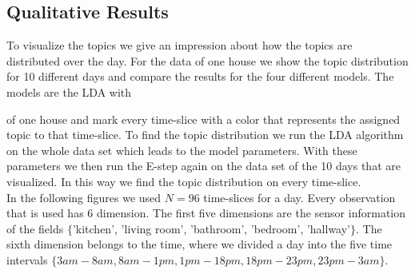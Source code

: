 \documentclass[a4paper,fleqn]{article}
\begin{document}








\subsection{Qualitative Results}
To visualize the topics we give an impression about how the topics are distributed over the day. For the data of one house we show the topic distribution for 10 different days and compare the results for the four different models. The models are the LDA with 

of one house and mark every time-slice with a color that represents the assigned topic to that time-slice. To find the topic distribution we run the LDA algorithm on the whole data set which leads to the model parameters. With these parameters we then run the E-step again on the data set of the 10 days that are visualized. In this way we find the topic distribution on every time-slice.\\
In the following figures we used $N=96$ time-slices for a day. Every observation that is used has 6 dimension. The first five dimensions are the sensor information of the fields $\{$'kitchen', 'living room', 'bathroom', 'bedroom', 'hallway'$\}$. The sixth dimension belongs to the time, where we divided a day into the five time intervals $\{ 3am - 8am, 8am - 1pm, 1pm - 18pm, 18pm - 23pm, 23pm - 3am  \}$.
\end{document}
